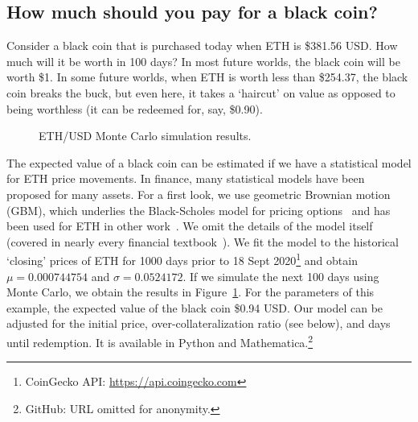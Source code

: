 
\subsection{How much should you pay for a black coin?}

Consider a black coin that is purchased today when ETH is \$381.56 USD. How much will it be worth in 100 days? In most future worlds, the black coin will be worth \$1. In some future worlds, when ETH is worth less than \$254.37, the black coin breaks the buck, but even here, it takes a `haircut' on value as opposed to being worthless (\eg it can be redeemed for, say, \$0.90). 

\begin{figure}[t]
    \centering
        \qquad
    \caption{ETH/USD Monte Carlo simulation results. \label{fig:sim}}
\end{figure}

The expected value of a black coin can be estimated if we have a statistical model for ETH price movements. In finance, many statistical models have been proposed for many assets. For a first look, we use geometric Brownian motion (GBM), which underlies the Black-Scholes model for pricing options~\cite{BS73} and has been used for ETH in other work~\cite{GPH+20}. We omit the details of the model itself (covered in nearly every  financial textbook~\cite{Sey09}). We fit the model to the historical `closing' prices of ETH for 1000 days prior to 18 Sept 2020\footnote{CoinGecko API: \url{https://api.coingecko.com}} and obtain $\mu=0.000744754$ and $\sigma=0.0524172$. If we simulate the next 100 days using Monte Carlo, we obtain the results in Figure~\ref{fig:sim}. For the parameters of this example, the expected value of the black coin \$0.94 USD. Our model can be adjusted for the initial price, over-collateralization ratio (see below), and days until redemption. It is available in Python and Mathematica.\footnote{GitHub: URL omitted for anonymity.} 

